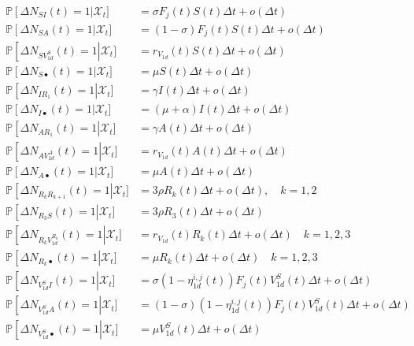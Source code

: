 \begin{gather}
\label{eq:stochsys}
\begin{aligned}
    \mathbb{P}\left[ \Delta N_{SI}(t) = 1 \right|\mathcal{X}_t] &= \sigma F_j(t) S(t) \Delta t + o(\Delta t)\\
    \mathbb{P}\left[ \Delta N_{SA}(t) = 1 \right|\mathcal{X}_t] &= (1-\sigma) F_j(t) S(t) \Delta t + o(\Delta t)\\
    \mathbb{P}\left[ \Delta N_{SV_{1d}^S}(t) = 1 \right|\mathcal{X}_t] &= r_{V_{1d}}(t) S(t) \Delta t + o(\Delta t)\\
    \mathbb{P}\left[ \Delta N_{S\bullet}(t) = 1 \right|\mathcal{X}_t] &= \mu  S(t) \Delta t + o(\Delta t)\\
    \mathbb{P}\left[ \Delta N_{IR_1}(t) = 1 \right|\mathcal{X}_t] &= \gamma I(t) \Delta t + o(\Delta t)\\
    \mathbb{P}\left[ \Delta N_{I\bullet}(t) = 1 \right|\mathcal{X}_t] &= (\mu+\alpha)I(t) \Delta t + o(\Delta t)\\
    \mathbb{P}\left[ \Delta N_{AR_1}(t) = 1 \right|\mathcal{X}_t] &= \gamma A(t) \Delta t + o(\Delta t)\\
      \mathbb{P}\left[ \Delta N_{AV_{1d}^A}(t) = 1 \right|\mathcal{X}_t] &= r_{V_{1d}}(t) A(t) \Delta t + o(\Delta t)\\
      \mathbb{P}\left[ \Delta N_{A\bullet}(t) = 1 \right|\mathcal{X}_t] &= \mu  A(t) \Delta t + o(\Delta t)\\
    \mathbb{P}\left[ \Delta N_{R_kR_{k+1}}(t) = 1 \right|\mathcal{X}_t] &= 3\rho R_k(t) \Delta t + o(\Delta t),\quad k=1,2\\
    \mathbb{P}\left[ \Delta N_{R_3S}(t) = 1 \right|\mathcal{X}_t] &= 3\rho R_3(t) \Delta t + o(\Delta t)\\
    \mathbb{P}\left[ \Delta N_{R_kV_{1d}^{R_k}}(t) = 1 \right|\mathcal{X}_t] &= r_{V_{1d}}(t) R_k(t) \Delta t + o(\Delta t)\quad k=1,2,3\\
    \mathbb{P}\left[ \Delta N_{R_k\bullet}(t) = 1 \right|\mathcal{X}_t] &= \mu  R_k(t) \Delta t + o(\Delta t)\quad k=1,2,3\\
    \mathbb{P}\left[ \Delta N_{V_{1d}^SI}(t) = 1 \right|\mathcal{X}_t] &=  \sigma (1-\eta_{1d}^{i,j}(t)) F_j(t) V_{1d}^S(t) \Delta t + o(\Delta t)\\
    \mathbb{P}\left[ \Delta N_{V_{1d}^SA}(t) = 1 \right|\mathcal{X}_t] &=  (1-\sigma) (1-\eta_{1d}^{i,j}(t)) F_j(t) V_{1d}^S(t) \Delta t + o(\Delta t)\\
    \mathbb{P}\left[ \Delta N_{V_{1d}^S\bullet}(t) = 1 \right|\mathcal{X}_t] &= \mu  V_{1d}^S(t) \Delta t + o(\Delta t)\\

\end{aligned}
\end{gather}
